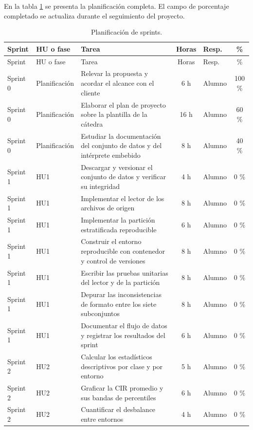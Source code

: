 \documentclass[
11pt, %
]{charter}
\begin{document}
En la tabla \ref{tab:sprints} se presenta la planificación completa. El campo de porcentaje completado se actualiza durante el seguimiento del proyecto.

\begin{longtable}{@{}|l|l|p{5.4cm}|c|l|c|@{}}
\caption{Planificación de sprints.}
\label{tab:sprints} \\
\hline
\rowcolor[HTML]{C0C0C0}
Sprint & HU o fase & Tarea & Horas & Resp. & \% \\ \hline
\endfirsthead
\hline
\rowcolor[HTML]{C0C0C0}
Sprint & HU o fase & Tarea & Horas & Resp. & \% \\ \hline
\endhead
Sprint 0 & Planificación & Relevar la propuesta y acordar el alcance con el cliente & 6 h & Alumno & 100 \% \\ \hline
Sprint 0 & Planificación & Elaborar el plan de proyecto sobre la plantilla de la cátedra & 16 h & Alumno & 60 \% \\ \hline
Sprint 0 & Planificación & Estudiar la documentación del conjunto de datos y del intérprete embebido & 8 h & Alumno & 40 \% \\ \hline
Sprint 1 & HU1 & Descargar y versionar el conjunto de datos y verificar su integridad & 4 h & Alumno & 0 \% \\ \hline
Sprint 1 & HU1 & Implementar el lector de los archivos de origen & 8 h & Alumno & 0 \% \\ \hline
Sprint 1 & HU1 & Implementar la partición estratificada reproducible & 6 h & Alumno & 0 \% \\ \hline
Sprint 1 & HU1 & Construir el entorno reproducible con contenedor y control de versiones & 8 h & Alumno & 0 \% \\ \hline
Sprint 1 & HU1 & Escribir las pruebas unitarias del lector y de la partición & 8 h & Alumno & 0 \% \\ \hline
Sprint 1 & HU1 & Depurar las inconsistencias de formato entre los siete subconjuntos & 8 h & Alumno & 0 \% \\ \hline
Sprint 1 & HU1 & Documentar el flujo de datos y registrar los resultados del sprint & 6 h & Alumno & 0 \% \\ \hline
Sprint 2 & HU2 & Calcular los estadísticos descriptivos por clase y por entorno & 5 h & Alumno & 0 \% \\ \hline
Sprint 2 & HU2 & Graficar la CIR promedio y sus bandas de percentiles & 6 h & Alumno & 0 \% \\ \hline
Sprint 2 & HU2 & Cuantificar el desbalance entre entornos & 4 h & Alumno & 0 \% \\ \hline

\end{longtable}
\end{document}
